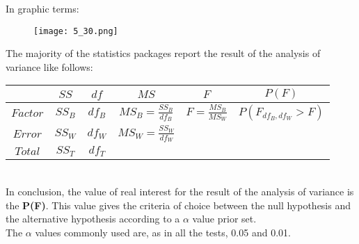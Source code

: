 \begin{frame}
  \vspace*{.25cm}
  In graphic terms:\\
  \vspace*{.25cm}
  \begin{figure}
    \texttt{[image: 5\_30.png]}
  \end{figure}
\end{frame}

\begin{frame}
  \vspace*{.25cm}
  The majority of the statistics packages report the result of the analysis of variance like follows:\\
  \vspace*{.5cm}
  \begin{tabular}{|c|c|c|c|c|c|}
    \hline
    & $SS$  & $df$ & $MS$  & $F$  &  $P(F)$ \\ \hline
    $Factor$  & $SS_B$  & $df_B$  &  $MS_B=\frac{SS_B}{df_B}$ &  $F=\frac{MS_B}{MS_W}$ & $P(F_{df_B,df_W}>F)$\\ \hline
    $Error$  &  $SS_W$ & $df_W$  & $MS_W=\frac{SS_W}{df_W}$  &   &   \\ \hline
    $Total$  & $SS_T$  & $df_T$  &   &   &   \\ \hline
  \end{tabular}\\
  \vspace*{.5cm}
  In conclusion, the value of real interest for the result of the analysis of variance is the \textbf{P(F)}. This value gives the criteria of choice between the null hypothesis and the alternative hypothesis according to a {\boldmath$\alpha$} value prior set.\\
  The {\boldmath$\alpha$} values commonly used are, as in all the tests, 0.05 and 0.01.
\end{frame}


